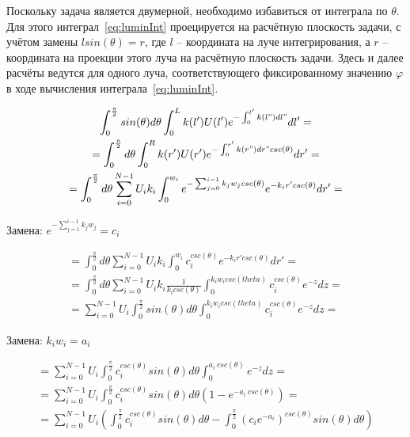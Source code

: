 Поскольку задача является двумерной, необходимо избавиться от интеграла по 
$\theta$. 
Для этого интеграл~\eqref{eq:luminInt} проецируется на расчётную плоскость 
задачи, с учётом замены $l sin(\theta) = r$, где $l$ -- координата на луче 
интегрирования, а $r$ -- координата на проекции этого луча на расчётную 
плоскость задачи. Здесь и далее расчёты ведутся для одного луча, 
соответствующего фиксированному значению $\varphi$ в ходе вычисления 
интеграла~\eqref{eq:luminInt}.

\begin{gather*}
\int_{0}^{\frac{\pi}{2}} sin(\theta)d\theta
\int_{0}^{L}k(l')U(l')e^{-\int_{0}^{l'}k(l")dl" }dl'  = \\
=\int_{0}^{\frac{\pi}{2}} d\theta
\int_{0}^{R}k(r')U(r')e^{-\int_{0}^{r'}k(r")dr" csc(\theta)}dr' =\\ 
=\int_{0}^{\frac{\pi}{2}} d\theta
\sum_{i=0}^{N-1} U_i k_i 
\int_{0}^{w_i} 
e^{-\sum_{j=0}^{i-1}k_j w_j csc(\theta)} e^{-k_i r' csc(\theta)}dr' =
\end{gather*}

Замена: $e^{-\sum_{j=1}^{i-1}k_j w_j} = c_i$

\begin{gather*}
=\int_{0}^{\frac{\pi}{2}} d\theta
\sum_{i=0}^{N-1} U_i k_i \int_{0}^{w_i} 
c_i^{csc(\theta)} e^{-k_i r' csc(\theta)}dr'  =\\  
=\int_{0}^{\frac{\pi}{2}} d\theta
\sum_{i=0}^{N-1} U_i k_i \frac{1}{k_i csc(\theta)}\int_{0}^{k_i w_i csc(theta)} 
c_i^{csc(\theta)} e^{-z}dz  =\\                  
=\sum_{i=0}^{N-1} U_i 
\int_{0}^{\frac{\pi}{2}} sin(\theta)d\theta
\int_{0}^{k_i w_i csc(theta)} 
c_i^{csc(\theta)} e^{-z}dz  =
\end{gather*}

Замена: $k_i w_i = a_i$

\begin{gather*}
=\sum_{i=0}^{N-1} U_i 
\int_{0}^{\frac{\pi}{2}} c_i^{csc(\theta)} sin(\theta)d\theta
\int_{0}^{a_i\ csc(\theta)} e^{-z}dz  =\\             
=\sum_{i=0}^{N-1} U_i 
\int_{0}^{\frac{\pi}{2}} c_i^{csc(\theta)} sin(\theta)d\theta
(1 - e^{-a_i\ csc(\theta)}) =\\    
=\sum_{i=0}^{N-1} U_i 
(
\int_{0}^{\frac{\pi}{2}} c_i^{csc(\theta)} sin(\theta)d\theta
-\int_{0}^{\frac{\pi}{2}} (c_ie^{-a_i})^{csc(\theta)} sin(\theta)d\theta
)
\end{gather*}

